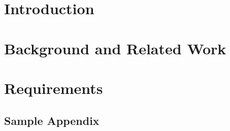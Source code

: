 \documentclass[a4paper, 11pt]{book}
\begin{document}
\mainmatter


\chapter{Introduction}
\label{chap:introduction}



\chapter{Background and Related Work}
\label{chap:background}


\chapter{Requirements}
\label{chap:requirements}





\titleformat{\chapter}[display]	%
{\normalfont\huge\bfseries}{\chaptertitlename\ \thechapter}{20pt}{\Huge}


\begin{appendix}			%
\chapter{Sample Appendix}	%
\label{app: sample appendix}

%

\end{appendix}
\end{document}
